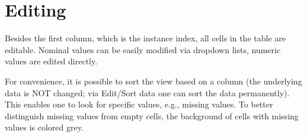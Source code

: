 \begin{center}
\end{center}


\newpage
\section{Editing}
Besides the first column, which is the instance index, all cells in the table are editable. Nominal values can be easily modified via dropdown lists, numeric values are edited directly.

\begin{center}
\end{center}

\newpage
For convenience, it is possible to sort the view based on a column (the underlying data is NOT changed; via Edit/Sort data one can sort the data permanently). This enables one to look for specific values, e.g., missing values. To better distinguish missing values from empty cells, the background of cells with missing values is colored grey.

\begin{center}
\end{center}
